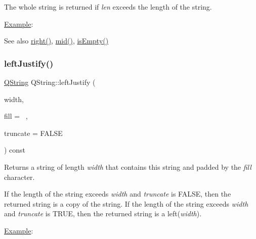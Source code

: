 The whole string is returned if {\itshape len} exceeds the length of the string.

\mbox{\hyperlink{struct_example}{Example}}\+: 
\begin{DoxyCode}{0}
\end{DoxyCode}


\begin{DoxySeeAlso}{See also}
\mbox{\hyperlink{class_q_string_aa77ad91688915fed22e4150b00b5fd92}{right()}}, \mbox{\hyperlink{class_q_string_a1ef65644b1885a7003d5c2a8e88df479}{mid()}}, \mbox{\hyperlink{class_q_string_aa032d4b5892338beb575a85e59bbbf38}{is\+Empty()}} 
\end{DoxySeeAlso}
\mbox{\label{class_q_string_a5a4d00c06bb265d1d91100c816ce1ba2}} 
\subsubsection{\texorpdfstring{leftJustify()}{leftJustify()}}
{\footnotesize\ttfamily \mbox{\hyperlink{class_q_string}{Q\+String}} Q\+String\+::left\+Justify (\begin{DoxyParamCaption}\item[{uint}]{width,  }\item[{\mbox{\hyperlink{class_q_char}{Q\+Char}}}]{fill = {\ttfamily \textquotesingle{}~\textquotesingle{}},  }\item[{bool}]{truncate = {\ttfamily FALSE} }\end{DoxyParamCaption}) const}

Returns a string of length {\itshape width} that contains this string and padded by the {\itshape fill} character.

If the length of the string exceeds {\itshape width} and {\itshape truncate} is F\+A\+L\+SE, then the returned string is a copy of the string. If the length of the string exceeds {\itshape width} and {\itshape truncate} is T\+R\+UE, then the returned string is a left({\itshape width}).

\mbox{\hyperlink{struct_example}{Example}}\+: 
\begin{DoxyCode}{0}
\end{DoxyCode}


